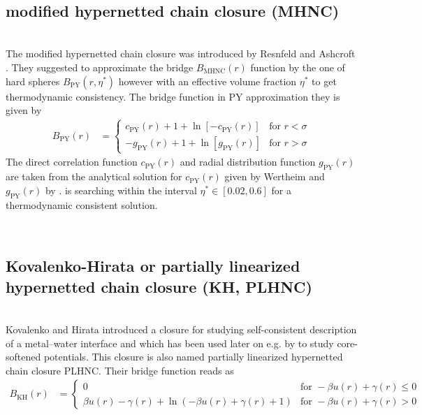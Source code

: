 \vphantom{.}~\\
\subsection{modified hypernetted chain closure (MHNC)}
\label{sec:PLHNC}~\\

The modified hypernetted chain closure was introduced by Resnfeld and Ashcroft \cite{Rosenfeld1979}. They suggested to approximate the bridge $B_\mathrm{MHNC}(r)$ function by the one of hard spheres $B_\mathrm{PY}(r,\eta^*)$ however with an effective volume fraction $\eta^*$ to get thermodynamic consistency. The bridge function in PY approximation they is given by
\begin{align}
B_\mathrm{PY}(r) &=
\begin{cases}
c_\mathrm{PY}(r) +1+\ln \left[ -c_\mathrm{PY}(r)\right] &\mbox{for } r<\sigma \\
-g_\mathrm{PY}(r) +1+\ln \left[ g_\mathrm{PY}(r)\right]
&\mbox{for } r>\sigma
\end{cases}
\end{align}
The direct correlation function $c_\mathrm{PY}(r)$ and radial distribution function $g_\mathrm{PY}(r)$ are taken from the analytical solution for $c_\mathrm{PY}(r)$ given by Wertheim \cite{Wertheim1963} and $g_\mathrm{PY}(r)$ by \cite{Trokhymchuk2005,Trokhymchuk2006}.  \SASfit is searching within the interval $\eta^* \in [0.02,0.6]$ for a thermodynamic consistent solution.

\vphantom{.}~\\
\subsection{Kovalenko-Hirata or partially linearized hypernetted chain closure (KH, PLHNC)}
\label{sec:PLHNC}~\\

Kovalenko and Hirata \cite{Kovalenko1999} introduced a closure for studying self-consistent description of a metal–water interface and which has been used later on e.g. by \cite{Hus2013} to study core-softened potentials. This closure is also named partially linearized hypernetted chain closure PLHNC. Their bridge function reads as
\begin{align} \label{eq:ozKH}
B_\text{KH}(r)
&=
\begin{cases}
0  & \mbox{for } -\beta u(r) + \gamma(r) \leq 0  \\
\beta u(r)-\gamma(r)+\ln(-\beta u(r)+\gamma(r)+1)   & \mbox{for } -\beta u(r) + \gamma(r) > 0
\end{cases}
\end{align}

